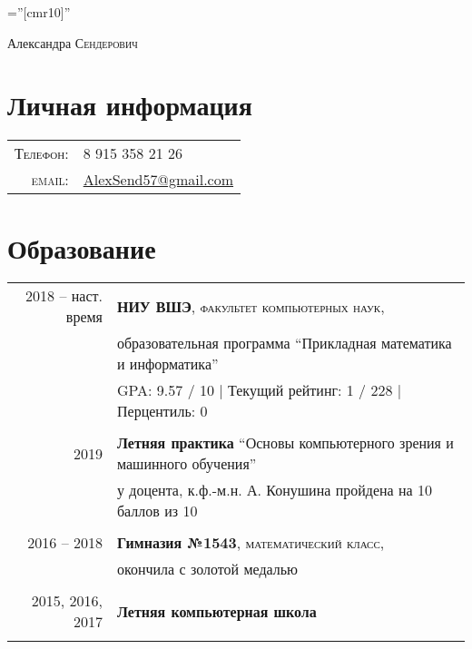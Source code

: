 \documentclass[a4paper,10pt]{article}
\begin{document}

\pagestyle{empty} %

\font\fb=''[cmr10]'' %

\par{\centering
		{\Huge Александра \textsc{Сендерович}
	}\bigskip\par}

\section{Личная информация}

\begin{tabular}{rl}
    \textsc{Телефон:}     & 8 915 358 21 26\\
    \textsc{email:}     & \href{mailto:AlexSend57@gmail.com}{AlexSend57@gmail.com}
\end{tabular}

\section{Образование}
\begin{tabular}{rl}	
2018 -- наст. время & \textbf{НИУ ВШЭ}, \textsc{факультет компьютерных наук}, \\ & образовательная программа ``Прикладная математика и информатика''\\
& GPA: 9.57 / 10 | Текущий рейтинг: 1 / 228 | Перцентиль: 0 \\
&\\
2019 & \textbf{Летняя практика} ``Основы компьютерного зрения и машинного обучения'' \\
& у доцента, к.ф.-м.н. А. Конушина пройдена на 10 баллов из 10 \\
&\\

2016 -- 2018 & \textbf{Гимназия №1543}, \textsc{математический класс}, \\
& окончила с золотой медалью \\
&\\

2015, 2016, 2017 & \textbf{Летняя компьютерная школа}\\
&\\
\end{tabular}
\end{document}
